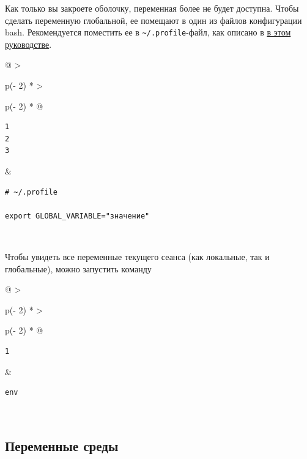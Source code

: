 \documentclass{article}
\begin{document}
Как только вы закроете оболочку, переменная более не будет доступна.
Чтобы сделать переменную глобальной, ее помещают в один из файлов
конфигурации bash. Рекомендуется поместить ее в
\texttt{\textasciitilde{}/.profile}-файл, как описано в
\href{blog/2019/user-permissions/}{в этом руководстве}.

\begin{longtable}[]{@{}
  >{\raggedright\arraybackslash}p{(\columnwidth - 2\tabcolsep) * }
  >{\raggedright\arraybackslash}p{(\columnwidth - 2\tabcolsep) * }@{}}
\toprule
\endhead
\begin{minipage}[t]{\linewidth}\raggedright
\begin{verbatim}
1
2
3
\end{verbatim}
\end{minipage} & \begin{minipage}[t]{\linewidth}\raggedright
\begin{verbatim}
# ~/.profile

export GLOBAL_VARIABLE="значение"
\end{verbatim}
\end{minipage} \\ \addlinespace
\bottomrule
\end{longtable}

Чтобы увидеть все переменные текущего сеанса (как локальные, так и
глобальные), можно запустить команду

\begin{longtable}[]{@{}
  >{\raggedright\arraybackslash}p{(\columnwidth - 2\tabcolsep) * }
  >{\raggedright\arraybackslash}p{(\columnwidth - 2\tabcolsep) * }@{}}
\toprule
\endhead
\begin{minipage}[t]{\linewidth}\raggedright
\begin{verbatim}
1
\end{verbatim}
\end{minipage} & \begin{minipage}[t]{\linewidth}\raggedright
\begin{verbatim}
env
\end{verbatim}
\end{minipage} \\ \addlinespace
\bottomrule
\end{longtable}

\hypertarget{Shell-Variables}{%
\subsection{\texorpdfstring{\protect\hyperlink{Shell-Variables}{}Переменные
среды}{Переменные среды}}\label{Shell-Variables}}
\end{document}
